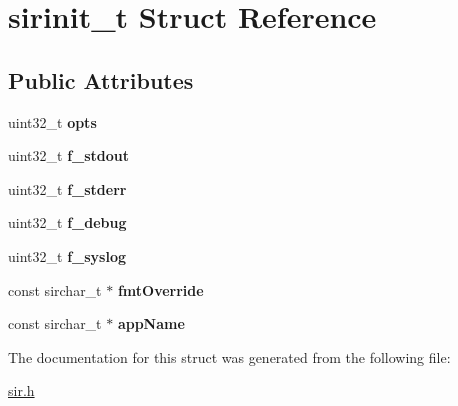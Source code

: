 \hypertarget{structsirinit__t}{}\section{sirinit\+\_\+t Struct Reference}
\label{structsirinit__t}
\subsection*{Public Attributes}
\begin{DoxyCompactItemize}
\item 
uint32\+\_\+t {\bfseries opts}\hypertarget{structsirinit__t_a3c95398fc13795dce52b002116b951c8}{}\label{structsirinit__t_a3c95398fc13795dce52b002116b951c8}

\item 
uint32\+\_\+t {\bfseries f\+\_\+stdout}\hypertarget{structsirinit__t_adf23180c53ed78c3e930f9b90c8b7d0a}{}\label{structsirinit__t_adf23180c53ed78c3e930f9b90c8b7d0a}

\item 
uint32\+\_\+t {\bfseries f\+\_\+stderr}\hypertarget{structsirinit__t_ac62ba58c8a556fb461b24fd452ba5473}{}\label{structsirinit__t_ac62ba58c8a556fb461b24fd452ba5473}

\item 
uint32\+\_\+t {\bfseries f\+\_\+debug}\hypertarget{structsirinit__t_a5e851c5fccc918bf19e8532ed9eb4c90}{}\label{structsirinit__t_a5e851c5fccc918bf19e8532ed9eb4c90}

\item 
uint32\+\_\+t {\bfseries f\+\_\+syslog}\hypertarget{structsirinit__t_af5723f1026c84696cc3b6947c8636e66}{}\label{structsirinit__t_af5723f1026c84696cc3b6947c8636e66}

\item 
const sirchar\+\_\+t $\ast$ {\bfseries fmt\+Override}\hypertarget{structsirinit__t_aff085687b843f75f632d15b3da6ef04a}{}\label{structsirinit__t_aff085687b843f75f632d15b3da6ef04a}

\item 
const sirchar\+\_\+t $\ast$ {\bfseries app\+Name}\hypertarget{structsirinit__t_a1724471bf549b9620f9b29faf3ada693}{}\label{structsirinit__t_a1724471bf549b9620f9b29faf3ada693}

\end{DoxyCompactItemize}


The documentation for this struct was generated from the following file\+:\begin{DoxyCompactItemize}
\item 
\hyperlink{sir_8h}{sir.\+h}\end{DoxyCompactItemize}
